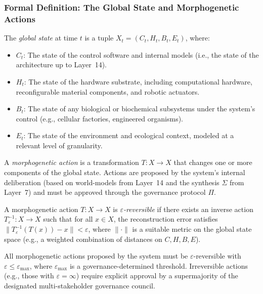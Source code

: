 \subsubsection{Formal Definition: The Global State and Morphogenetic Actions}
\begin{definition}
The \emph{global state} at time $t$ is a tuple $X_t = (C_t, H_t, B_t, E_t)$, where:
\begin{itemize}
    \item $C_t$: The state of the control software and internal models (i.e., the state of the \Apeiron{} architecture up to Layer~14).
    \item $H_t$: The state of the hardware substrate, including computational hardware, reconfigurable material components, and robotic actuators.
    \item $B_t$: The state of any biological or biochemical subsystems under the system's control (e.g., cellular factories, engineered organisms).
    \item $E_t$: The state of the environment and ecological context, modeled at a relevant level of granularity.
\end{itemize}
\end{definition}

\begin{definition}
A \emph{morphogenetic action} is a transformation $T: X \to X$ that changes one or more components of the global state. Actions are proposed by the system's internal deliberation (based on world-models from Layer~14 and the synthesis $\Sigma$ from Layer~7) and must be approved through the governance protocol $\Pi$.
\end{definition}

\begin{definition}
A morphogenetic action $T: X \to X$ is \emph{$\varepsilon$-reversible} if there exists an inverse action $T^{-1}_\varepsilon: X \to X$ such that for all $x \in X$, the reconstruction error satisfies $\|T^{-1}_\varepsilon(T(x)) - x\| < \varepsilon$, where $\|\cdot\|$ is a suitable metric on the global state space (e.g., a weighted combination of distances on $C, H, B, E$).
\end{definition}

\begin{axiom}\label{ax:reversibility_mandate}
All morphogenetic actions proposed by the system must be $\varepsilon$-reversible with $\varepsilon \le \varepsilon_{\text{max}}$, where $\varepsilon_{\text{max}}$ is a governance-determined threshold. Irreversible actions (e.g., those with $\varepsilon = \infty$) require explicit approval by a supermajority of the designated multi-stakeholder governance council.
\end{axiom}


